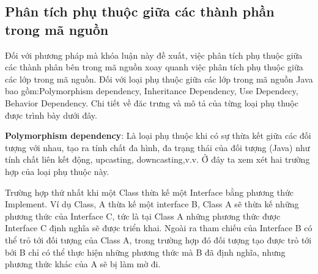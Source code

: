 \documentclass[12pt]{report}
\begin{document}
\subsection{Phân tích phụ thuộc giữa các thành phần trong mã nguồn}
Đối với phương pháp mà khóa luận này đề xuất, việc phân tích phụ thuộc giữa các thành phân bên trong mã nguồn xoay quanh việc phân tích phụ thuộc giữa các lớp trong mã nguồn. Đối với loại phụ thuộc giữa các lớp trong mã nguồn Java bao gồm:Polymorphism dependency, Inheritance Dependency, Use Dependecy, 	Behavior Dependency. Chi tiết về đăc trưng và mô tả của từng loại phụ thuộc được trình bày dưới đây.

\noindent \textbf{Polymorphism dependency}: Là loại phụ thuộc khi có sự thừa kết giữa các đối tượng với nhau, tạo ra tính chất đa hình, đa trạng thái của đối tượng (Java) như tính chất liên kết động, upcasting, downcasting,v.v. Ở đây ta xem xét hai trường hợp của loại phụ thuộc này. 

\noindent Trường hợp thứ nhất khi một Class thừa kế một Interface bằng phương thức Implement. Ví dụ Class, A  thừa kế một interface B, Class A sẽ thừa kế những phương thức của Interface C, tức là tại Class A những phương thức được Interface C định nghĩa sẽ được triển khai. Ngoài ra tham chiếu của Interface B có thể trỏ tới đối tượng của Class A, trong trường hợp đó đối tượng tạo được trỏ tới bởi B chỉ có thể thực hiện những phương thức mà B đã định nghĩa, nhưng phương thức khác của A sẽ bị làm mờ đi. 
\end{document}
